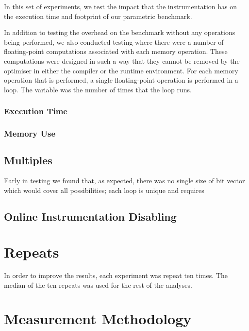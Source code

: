 	In this set of experiments, we test the impact that the instrumentation has on the execution time and footprint of our parametric benchmark.
	
	In addition to testing the overhead on the benchmark without any operations being performed, we also conducted testing where there were a number of floating-point computations associated with each memory operation. These computations were designed in such a way that they cannot be removed by the optimiser in either the compiler or the runtime environment. For each memory operation that is performed, a single floating-point operation is performed in a loop. The variable was the number of times that the loop runs.
	
		\subsubsection{Execution Time} \label{sec:methodology/experiments/overhead/time}
		
		\subsubsection{Memory Use} \label{sec:methodology/experiments/overhead/memory}
		
	\subsection{Multiples} \label{sec:methodology/experiments/multiples}
	Early in testing we found that, as expected, there was no single size of bit vector which would cover all possibilities; each loop is unique and requires 
	
	\subsection{Online Instrumentation Disabling} \label{sec:methodology/experiments/online-disable}

\section{Repeats} \label{sec:methodology/repeats}
In order to improve the results, each experiment was repeat ten times. The median of the ten repeats was used for the rest of the analyses.
	
\section{Measurement Methodology} \label{sec:methodology/measurements}
